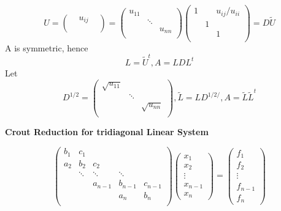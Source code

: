 \documentclass[11pt]{article}
\begin{document}
    \begin{equation*}
      U =
      \begin{pmatrix}
        &u_{ij}\\
        &&\\
      \end{pmatrix}=
      \begin{pmatrix}
        u_{11}&&\\
        &\ddots&\\
        &&u_{nn}\\
      \end{pmatrix}
      \begin{pmatrix}
        1&&u_{ij}/u_{ii}\\
        &1&\\
        &&1\\
      \end{pmatrix}=D\tilde{U}
    \end{equation*}
    A is symmetric, hence 
    \begin{equation*}
      L=\tilde{U}^t, A=LDL^t
    \end{equation*}
    Let 
    \begin{equation*}
      D^{1/2}=
      \begin{pmatrix}
        \sqrt{u_{11}}&&\\
        &\ddots&\\
        &&\sqrt{u_{nn}}\\
      \end{pmatrix}, \tilde{L}=LD^{1/2/}, A=\tilde{L}\tilde{L}^t
    \end{equation*}

    \textbf{Crout Reduction for tridiagonal Linear System}

    \begin{equation*}
      \begin{pmatrix}
        b_1 & c_1    &        &        &\\
        a_2 & b_2    & c_2    &        &\\
        & \ddots & \ddots & \ddots &\\
        &        & a_{n-1}& b_{n-1}& c_{n-1} \\
        &        &        & a_n    & b_n\\
      \end{pmatrix}
      \begin{pmatrix}
        x_1\\
        x_2\\
        \vdots\\
        x_{n-1}\\
        x_n
      \end{pmatrix}=
      \begin{pmatrix}
        f_1\\
        f_2\\
        \vdots\\
        f_{n-1}\\
        f_n
      \end{pmatrix}
    \end{equation*}
\end{document}
